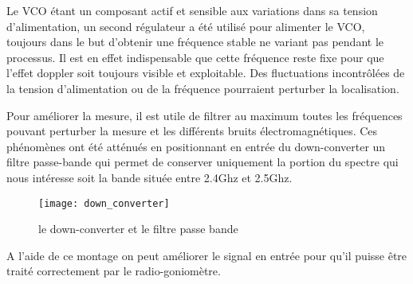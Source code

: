 Le VCO étant un composant actif et sensible aux variations dans sa tension d'alimentation, un second régulateur a été utilisé pour alimenter le VCO, toujours dans le but d’obtenir une fréquence stable ne variant pas pendant le processus. Il est en effet indispensable que cette fréquence reste fixe pour que l’effet doppler soit toujours visible et exploitable. Des fluctuations incontrôlées de la tension d'alimentation ou de la fréquence pourraient perturber la localisation.

Pour améliorer la mesure, il est utile de filtrer au maximum toutes les fréquences pouvant perturber la mesure et les différents bruits électromagnétiques. Ces phénomènes ont été atténués en positionnant en entrée du down-converter un filtre passe-bande qui permet de conserver uniquement la portion du spectre qui nous intéresse soit la bande située entre 2.4Ghz et 2.5Ghz.


\begin{figure}[h]
  \centering
  \texttt{[image: down\_converter]}
  \caption{le down-converter et le filtre passe bande}
  \label{fig:down}
\end{figure}

A l’aide de ce montage on peut améliorer le signal en entrée pour qu'il puisse être traité correctement par le radio-goniomètre.

